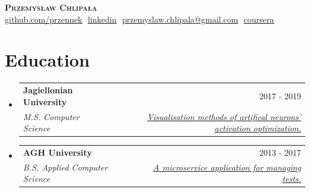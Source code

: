 \documentclass[letterpaper,11pt]{article}
\makeatletter
\newcommand{\resumeSubheading}[4]{
  \vspace{-2pt}\item
    \begin{tabular*}{0.97\textwidth}[t]{l@{\extracolsep{\fill}}r}
      \textbf{#1} & #2 \\
      \textit{\small#3} & \textit{\small #4} \\
    \end{tabular*}\vspace{-7pt}
}
\newcommand{\resumeSubHeadingListStart}{\begin{itemize}[leftmargin=0.15in, label={}]}
\newcommand{\resumeSubHeadingListEnd}{\end{itemize}}
\makeatother
\begin{document}

\begin{center}
    \textbf{\Huge \scshape Przemysław Chlipała} \\ \vspace{8pt}
    \small 
    \href{https://github.com/przennek}{\underline{github.com/przennek}} $  $
    \href{https://www.linkedin.com/in/przemys%C5%82aw-chlipa%C5%82a-712aa7106/}{\underline{linkedin}} $  $
    \href{mailto:przemyslaw.chlipala@gmail.com}
    {\underline{przemyslaw.chlipala@gmail.com}} $ $
    \href{https://www.coursera.org/user/2f79a023ccc47ab66ca3c0ca67fd77aa}{\underline{coursera}}
\end{center}

\section{Education}
  \resumeSubHeadingListStart
  
    \resumeSubheading
      {Jagiellonian University}{2017 - 2019}
      {M.S. Computer Science}{\href{https://github.com/przennek/neurons_activation_visualisation/blob/master/latex/praca.pdf}{Visualisation methods of artifical neurons' activation optimization.}}

    \resumeSubheading
      {AGH University}{2013 - 2017}
      {B.S. Applied Computer Science}{\href{https://misio.fis.agh.edu.pl/media/misiofiles/f697b33ada0bf415d95135a7010466a9.pdf}{A microservice application for managing tests.}}
      
  \resumeSubHeadingListEnd

\end{document}
